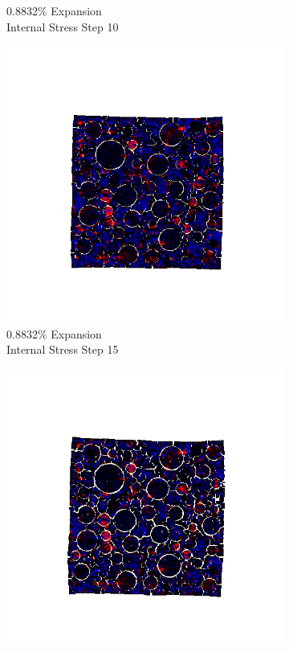 \begin{figure}[h!]
\begin{subfigure}{.25\textwidth}
      \caption{0.8832\% Expansion\\Internal Stress Step 10}
    \end{subfigure}%
    \begin{subfigure}{.25\textwidth}
      \centering
      \includegraphics[width=1.0\linewidth]{Files/exp_3D/ASR/A30P75_4_s15.png}
      \caption{0.8832\% Expansion\\Internal Stress Step 15}
    \end{subfigure}%
    \begin{subfigure}{.25\textwidth}
      \centering
      \includegraphics[width=1.0\linewidth]{Files/exp_3D/ASR/A30P75_4_stress.png}

\end{subfigure}
\end{figure}
